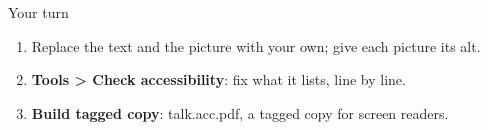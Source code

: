 \documentclass[aspectratio=169]{beamer}
\newcommand{\code}[1]{{\small\ttfamily #1}}
\begin{document}
\begin{frame}{Your turn}
  \begin{enumerate}
    \item Replace the text and the picture with your own; give each picture its \code{alt}.
    \item \textbf{Tools > Check accessibility}: fix what it lists, line by line.
    \item \textbf{Build tagged copy}: \code{talk.acc.pdf}, a tagged copy for screen readers.
  \end{enumerate}
\end{frame}
\end{document}
